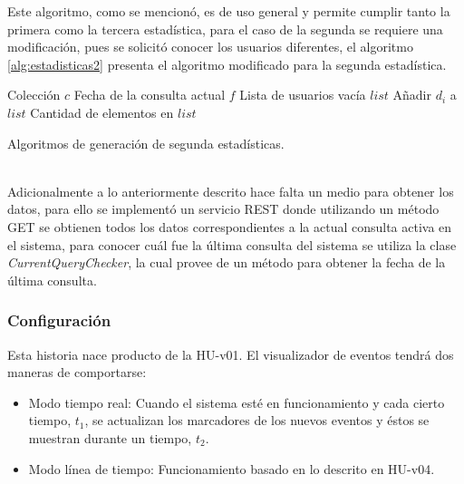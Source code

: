 Este algoritmo, como se mencionó, es de uso general y permite cumplir tanto la primera como la tercera estadística, para el caso de la segunda se requiere una modificación, pues se solicitó conocer los usuarios diferentes, el algoritmo \ref{alg:estadisticas2} presenta el algoritmo modificado para la segunda estadística.\\

\begin{algorithm}[H]
	\begin{algorithmic}
		\REQUIRE Colección $c$ 
		\REQUIRE Fecha de la consulta actual $f$ 
		\ENSURE Lista de usuarios vacía $list$  
					\STATE Añadir $d_{i}$ a $list$
				\ENDIF
			\ENDIF	
		\ENDFOR
		\RETURN Cantidad de elementos en $list$
	\end{algorithmic}
	\caption{Algoritmos de generación de segunda estadísticas.}
	\label{alg:estadisticas2}
\end{algorithm}\vphantom\\

Adicionalmente a lo anteriormente descrito hace falta un medio para obtener los datos, para ello se implementó un servicio REST donde utilizando un método GET se obtienen todos los datos correspondientes a la actual consulta activa en el sistema, para conocer cuál fue la última consulta del sistema se utiliza la clase \textit{CurrentQueryChecker}, la cual provee de un método para obtener la fecha de la última consulta.

\subsubsection*{Configuración}
\label{subsubsec:config}

Esta historia nace producto de la HU-v01. El visualizador de eventos tendrá dos maneras de comportarse:

\begin{itemize}
\item Modo tiempo real: Cuando el sistema esté en funcionamiento y cada cierto tiempo, $t_{1}$, se actualizan los marcadores de los nuevos eventos y éstos se muestran durante un tiempo, $t_{2}$.
\item Modo línea de tiempo: Funcionamiento basado en lo descrito en HU-v04.
\end{itemize}

